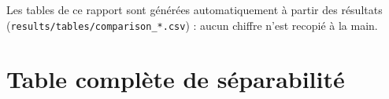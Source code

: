 \documentclass[11pt,a4paper]{article}
\begin{document}
Les tables de ce rapport sont générées automatiquement à partir des résultats
(\texttt{results/tables/comparison\_*.csv}) : aucun chiffre n'est recopié à la main.

\section{Table complète de séparabilité}


\end{document}
